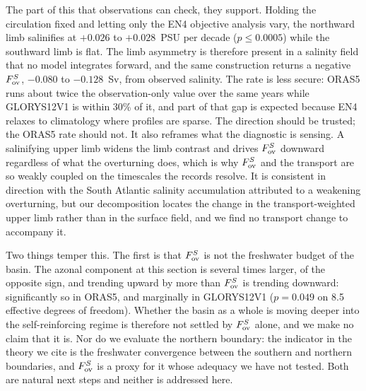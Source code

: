 The part of this that observations can check, they support. Holding the
circulation fixed and letting only the EN4 objective analysis vary, the
northward limb salinifies at $+0.026$ to $+0.028$~PSU per decade
($p\le0.0005$) while the southward limb is flat. The limb asymmetry is
therefore present in a salinity field that no model integrates forward, and the
same construction returns a negative $F_{\mathrm{ov}}^{S}$, $-0.080$ to $-0.128$~Sv, from
observed salinity. The rate is less secure: ORAS5 runs about twice the
observation-only value over the same years while GLORYS12V1 is within 30\% of
it, and part of that gap is expected because EN4 relaxes to climatology where
profiles are sparse. The direction should be trusted; the ORAS5 rate should
not.
It also reframes what the diagnostic is sensing. A salinifying upper limb widens
the limb contrast and drives $F_{\mathrm{ov}}^{S}$ downward regardless of what the overturning
does, which is why $F_{\mathrm{ov}}^{S}$ and the transport are so weakly coupled on the
timescales the records resolve. It is consistent in direction with the South
Atlantic salinity accumulation attributed to a weakening
overturning\cite{Zhu2020,Zhu2023}, but our decomposition locates the change in
the transport-weighted upper limb rather than in the surface field, and we find
no transport change to accompany it.

Two things temper this. The first is that $F_{\mathrm{ov}}^{S}$ is not the freshwater budget
of the basin. The azonal component at this section is several times larger, of
the opposite sign, and trending upward by more than $F_{\mathrm{ov}}^{S}$ is trending
downward: significantly so in ORAS5, and marginally in GLORYS12V1 ($p=0.049$ on
8.5 effective degrees of freedom). Whether the basin as a whole is
moving deeper into the self-reinforcing regime is therefore not settled by
$F_{\mathrm{ov}}^{S}$ alone, and we make no claim that it is. Nor do we evaluate the northern
boundary: the indicator in the theory we cite is the freshwater convergence
between the southern and northern boundaries, and $F_{\mathrm{ov}}^{S}$ is a proxy for it
whose adequacy we have not tested. Both are natural next steps and neither is
addressed here.

